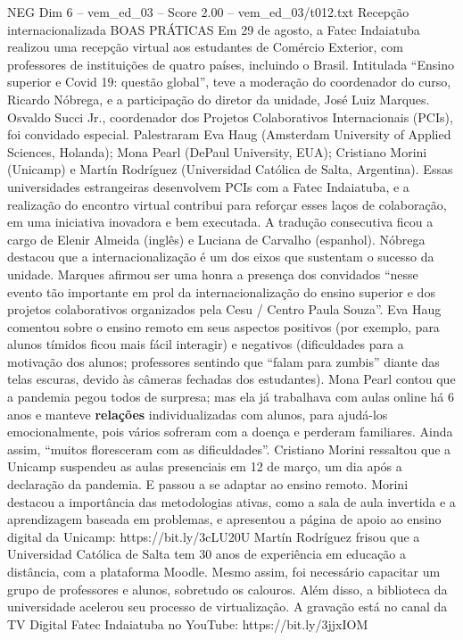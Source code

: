 \begin{textsample}{NEG Dim 6 – vem\_ed\_03 – Score 2.00 – vem\_ed\_03/t012.txt}  \label{ex:f6_neg_146}
Recepção internacionalizada BOAS PRÁTICAS Em 29 de agosto, a Fatec Indaiatuba realizou uma recepção virtual aos estudantes de Comércio Exterior, com professores de instituições de quatro países, incluindo o Brasil.
Intitulada “Ensino superior e Covid 19: questão global”, teve a moderação do coordenador do curso, Ricardo Nóbrega, e a participação do diretor da unidade, José Luiz Marques.
Osvaldo Succi Jr., coordenador dos Projetos Colaborativos Internacionais (PCIs), foi convidado especial.
Palestraram Eva Haug (Amsterdam University of Applied Sciences, Holanda); Mona Pearl (DePaul University, EUA); Cristiano Morini (Unicamp) e Martín Rodríguez (Universidad Católica de Salta, Argentina).
Essas universidades estrangeiras desenvolvem PCIs com a Fatec Indaiatuba, e a realização do encontro virtual contribui para reforçar esses laços de colaboração, em uma iniciativa inovadora e bem executada.
A tradução consecutiva ficou a cargo de Elenir Almeida (inglês) e Luciana de Carvalho (espanhol).
Nóbrega destacou que a internacionalização é um dos eixos que sustentam o sucesso da unidade.
Marques afirmou ser uma honra a presença dos convidados “nesse evento tão importante em prol da internacionalização do ensino superior e dos projetos colaborativos organizados pela Cesu / Centro Paula Souza”.
Eva Haug comentou sobre o ensino remoto em seus aspectos positivos (por exemplo, para alunos tímidos ficou mais fácil interagir) e negativos (dificuldades para a motivação dos alunos; professores sentindo que “falam para zumbis” diante das telas escuras, devido às câmeras fechadas dos estudantes).
Mona Pearl contou que a pandemia pegou todos de surpresa; mas ela já trabalhava com aulas online há 6 anos e manteve \textbf{relações} individualizadas com alunos, para ajudá-los emocionalmente, pois vários sofreram com a doença e perderam familiares.
Ainda assim, “muitos floresceram com as dificuldades”.
Cristiano Morini ressaltou que a Unicamp suspendeu as aulas presenciais em 12 de março, um dia após a declaração da pandemia.
E passou a se adaptar ao ensino remoto.
Morini destacou a importância das metodologias ativas, como a sala de aula invertida e a aprendizagem baseada em problemas, e apresentou a página de apoio ao ensino digital da Unicamp: https://bit.ly/3cLU20U Martín Rodríguez frisou que a Universidad Católica de Salta tem 30 anos de experiência em educação a distância, com a plataforma Moodle.
Mesmo assim, foi necessário capacitar um grupo de professores e alunos, sobretudo os calouros.
Além disso, a biblioteca da universidade acelerou seu processo de virtualização.
A gravação está no canal da TV Digital Fatec Indaiatuba no YouTube: https://bit.ly/3jjxIOM

\end{textsample}
